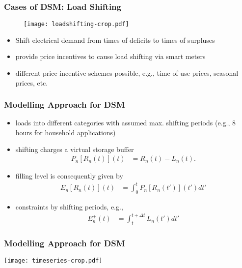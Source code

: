 \documentclass[10pt,aspectratio=169,dvipsnames]{beamer}
\let\olditem\item
\renewcommand{\item}{%
\olditem\vspace{5pt}}
\begin{document}
\begin{frame}
 \frametitle{Cases of DSM: Load Shifting}

   \begin{minipage}[t]{0.5\textwidth}
     \begin{figure}
  \texttt{[image: loadshifting-crop.pdf]}
  \end{figure}
\end{minipage}\hfill
\begin{minipage}[t]{0.5\textwidth}
\begin{itemize}
\item Shift electrical demand from times of deficits to times of surpluses
\item  provide price incentives to cause load shifting via smart meters
\item different price incentive schemes possible, e.g., time of use prices, seasonal prices, etc.
\end{itemize}
\end{minipage}

\end{frame}
\begin{frame}
 \frametitle{Modelling Approach for DSM}
  \begin{itemize}
  \item loads into different categories with assumed max. shifting periods (e.g., 8 hours for household applications)
  \item shifting charges a virtual storage buffer
  \begin{align}
 P_n[R_n(t)](t) &= R_n(t) - L_n(t).
\end{align}
\item filling level is consequently given by
\begin{align}
 E_n[R_n(t)](t) &= \int_0^t P_n[R_n(t')](t') dt'
\end{align}
\item constraints by shifting periods, e.g.,
\begin{align}
  E^{+}_n(t) &= \int_t^{t+\Delta t} L_n(t') dt'
\end{align}
 \end{itemize}

\end{frame}
\begin{frame}
\frametitle{Modelling Approach for DSM}
\centering
\texttt{[image: timeseries-crop.pdf]}
\end{frame}
\end{document}
